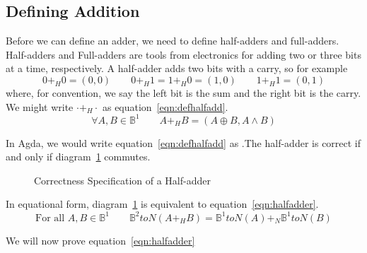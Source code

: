 \documentclass[14pt]{extarticle}  %
\begin{document}
\subsection{Defining Addition}
Before we can define an adder, we need to define half-adders and full-adders. Half-adders and Full-adders are tools from electronics for adding
two or three bits at a time, respectively.
A half-adder adds two bits with a carry, so for example
\[0 +_{H} 0 = (0,0) \qquad 0 +_{H} 1 = 1 +_{H} 0 = (1 , 0) \qquad 1 +_{H} 1 = (0 ,1 )\]
where, for convention, we say the left bit is the sum and the right bit is the carry.
We might write $\cdot +_{H}\cdot$ as equation~\ref{eqn:defhalfadd}.
\begin{equation}\label{eqn:defhalfadd}
  \forall A,B\in \mathbb{B}^{1} \qquad A +_{H} B = (A \oplus B , A \land B)
\end{equation}

In Agda, we would write equation~\ref{eqn:defhalfadd} as .The half-adder is correct if and only if diagram~\ref{fig:halfadder} commutes.
\begin{figure}[h]
\centering
\caption{Correctness Specification of a Half-adder}
\label{fig:halfadder}
\end{figure}
In equational form, diagram~\ref{fig:halfadder} is equivalent to equation~\ref{eqn:halfadder}.
\begin{equation}\label{eqn:halfadder}
  \text{For all } A,B \in \mathbb{B}^{1} \qquad \mathbb{B}^{2}toN(A +_{H} B) = \mathbb{B}^{1}toN(A) +_{N} \mathbb{B}^{1}toN(B)
\end{equation}

We will now prove equation~\ref{eqn:halfadder}
\end{document}
